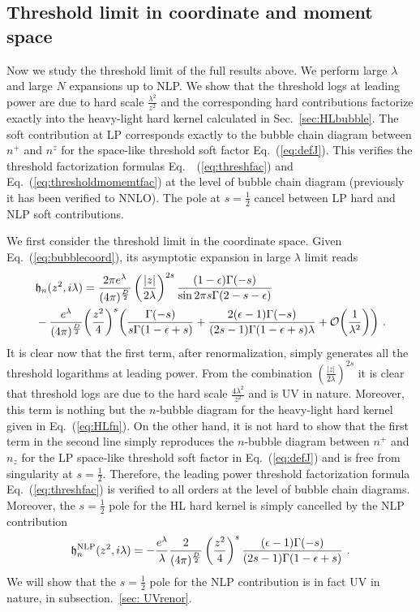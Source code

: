\documentclass[a4paper,11pt]{article}
\begin{document}
\subsection{Threshold limit in coordinate and moment space}
Now we study the threshold limit of the full results above. We perform large $\lambda$ and large $N$ expansions up to NLP. We show that the threshold logs at leading power are due to hard scale $\frac{\lambda^2}{z^2}$ and the
corresponding hard contributions factorize exactly into the heavy-light hard kernel calculated in Sec.~\ref{sec:HLbubble}. The soft contribution at LP corresponds exactly to the bubble chain diagram between $n^+$ and $n^z$ for the space-like threshold soft factor Eq.~(\ref{eq:defJ}). This verifies the threshold factorization formulas Eq.~~(\ref{eq:threshfac}) and Eq.~(\ref{eq:thresholdmomemtfac})  at the level of bubble chain diagram (previously it has been verified to NNLO). The pole at $s=\frac{1}{2}$ cancel between LP hard and NLP soft contributions.

We first consider the threshold limit in the coordinate space. Given Eq.~(\ref{eq:bubblecoord}), its asymptotic expansion in large $\lambda$ limit reads
\begin{align}\label{eq:thresholdlimitc}
&\mathfrak{h}_n(z^2,i\lambda)=\frac{2\pi e^{\lambda}}{(4\pi)^{\frac{D}{2}}}\left(\frac{|z|}{2\lambda}\right)^{2s}\frac{(1-\epsilon)\Gamma(-s)}{\sin 2\pi s \Gamma(2-s-\epsilon)}\nonumber \\ 
&-\frac{e^{\lambda}}{(4\pi)^{\frac{D}{2}}}\bigg(\frac{z^2}{4}\bigg)^s\bigg(\frac{\Gamma(-s)}{s\Gamma(1-\epsilon+s)}+\frac{2(\epsilon-1)\Gamma(-s)}{(2s-1)\Gamma(1-\epsilon+s)\lambda}+{\cal O}\bigg(\frac{1}{\lambda^2}\bigg)\bigg) \ .
\end{align}
It is clear now that the first term, after renormalization, simply generates all the threshold logarithms at leading power. From the combination $\left(\frac{|z|}{2\lambda}\right)^{2s}$ it is clear that threshold logs are due to the hard scale $\frac{4\lambda^2}{z^2}$ and is UV in nature. Moreover, this term is nothing but the $n$-bubble diagram for the heavy-light hard kernel given in Eq.~(\ref{eq:HLfn}). On the other hand, it is not hard to show that the first term in the second line simply reproduces the $n$-bubble diagram between $n^+$ and $n_z$ for the LP space-like threshold soft factor in Eq.~(\ref{eq:defJ}) and is free from singularity at $s=\frac{1}{2}$. Therefore, the leading power threshold factorization formula Eq.~(\ref{eq:threshfac}) is verified to all orders at the level of bubble chain diagrams. Moreover, the $s=\frac{1}{2}$ pole for the HL hard kernel is simply cancelled by the NLP contribution 
\begin{align}\label{eq:thresholdNLPcoor}
\mathfrak{h}_n^{\rm NLP}(z^2,i\lambda)=-\frac{ e^{\lambda}}{\lambda}\frac{2}{(4\pi)^{\frac{D}{2}}}\left(\frac{z^2}{4}\right)^s\frac{(\epsilon-1)\Gamma(-s)}{(2s-1)\Gamma(1-\epsilon+s)} \ .
\end{align}
We will show that the $s=\frac{1}{2}$ pole for the NLP contribution is in fact UV in nature, in subsection.~\ref{sec: UVrenor}.
\end{document}
